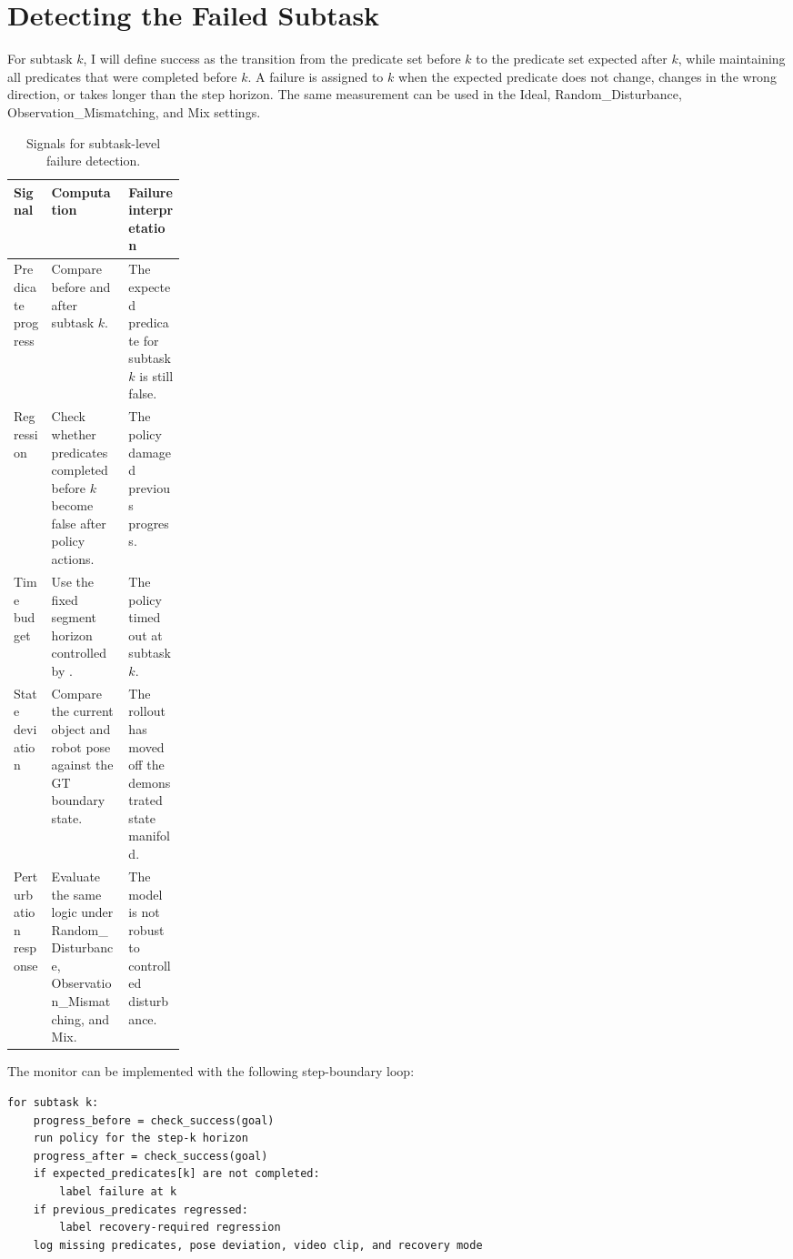 \documentclass[11pt]{article}
\newcommand{\code}[1]{\texttt{\detokenize{#1}}}
\begin{document}
\section{Detecting the Failed Subtask}

For subtask $k$, I will define success as the transition from the predicate set before $k$ to the predicate set expected after $k$, while maintaining all predicates that were completed before $k$. A failure is assigned to $k$ when the expected predicate does not change, changes in the wrong direction, or takes longer than the step horizon. The same measurement can be used in the Ideal, Random\_Disturbance, Observation\_Mismatching, and Mix settings.

\begin{table}[htbp]
\centering
\caption{Signals for subtask-level failure detection.}
\begin{tabularx}{\linewidth}{>{\raggedright\arraybackslash}p{0.22\linewidth}Y Y}
\toprule
\textbf{Signal} & \textbf{Computation} & \textbf{Failure interpretation} \\
\midrule
Predicate progress & Compare \code{env._check_success(goal)} before and after subtask $k$. & The expected predicate for subtask $k$ is still false. \\
Regression & Check whether predicates completed before $k$ become false after policy actions. & The policy damaged previous progress. \\
Time budget & Use the fixed segment horizon controlled by \code{switch_steps}. & The policy timed out at subtask $k$. \\
State deviation & Compare the current object and robot pose against the GT boundary state. & The rollout has moved off the demonstrated state manifold. \\
Perturbation response & Evaluate the same logic under Random\_Disturbance, Observation\_Mismatching, and Mix. & The model is not robust to controlled disturbance. \\
\bottomrule
\end{tabularx}
\end{table}

The monitor can be implemented with the following step-boundary loop:

\begin{lstlisting}[style=pseudo]
for subtask k:
    progress_before = check_success(goal)
    run policy for the step-k horizon
    progress_after = check_success(goal)
    if expected_predicates[k] are not completed:
        label failure at k
    if previous_predicates regressed:
        label recovery-required regression
    log missing predicates, pose deviation, video clip, and recovery mode
\end{lstlisting}
\end{document}
